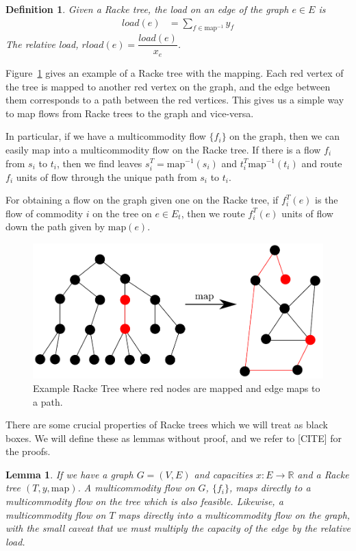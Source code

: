 \documentclass[12pt]{article}
\newtheorem{definition}{Definition}
\newtheorem{lemma}{Lemma}
\begin{document}
\begin{definition}
Given a Racke tree, the load on an edge of the graph $e \in E$ is
\begin{align}
load(e) &= \sum_{f \in \text{map}^{-1}} y_f
\end{align}
The relative load, $rload(e) = \dfrac{load(e)}{x_e}$. 
\end{definition}

Figure~\ref{fig:racketree} gives an example of a Racke tree with the mapping. Each red vertex of the tree is mapped to another red vertex on the graph, and the edge between them corresponds to a path between the red vertices. This gives us a simple way to map flows from Racke trees to the graph and vice-versa. 

In particular, if we have a multicommodity flow $\{ f_i \}$ on the graph, then we can easily map into a multicommodity flow on the Racke tree. If there is a flow $f_i$ from $s_i$ to $t_i$, then we find leaves $s_i^{T}=\text{map}^{-1}(s_i)$ and $t_i^T\text{map}^{-1}(t_i)$ and route $f_i$ units of flow through the unique path from $s_i$ to $t_i$.

For obtaining a flow on the graph given one on the Racke tree, if $f_i^T(e)$ is the flow of commodity $i$ on the tree on $e \in E_t$, then we route $f_i^T(e)$ units of flow down the path given by $\text{map}(e)$.   

\begin{figure}
\label{fig:racketree}
\centering
\includegraphics[width=\linewidth]{Rackeembeddinggraph.pdf}
\caption{Example Racke Tree where red nodes are mapped and edge maps to a path.}
\end{figure}

There are some crucial properties of Racke trees which we will treat as black boxes. We will define these as lemmas without proof, and we refer to [CITE] for the proofs.

\begin{lemma}
If we have a graph $G = (V, E)$ and capacities $x: E \rightarrow \mathbb{R}$ and a Racke tree $(T, y, \text{map})$. A multicommodity flow on $G$, $\{ f_i \}$, maps directly to a multicommodity flow on the tree which is also feasible. Likewise, a multicommodity flow on $T$ maps directly into a multicommodity flow on the graph, with the small caveat that we must multiply the capacity of the edge by the relative load. 
\end{lemma}
\end{document}
